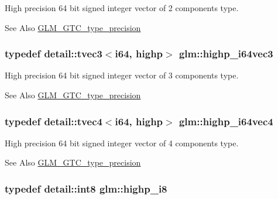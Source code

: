 High precision 64 bit signed integer vector of 2 components type. \begin{DoxySeeAlso}{See Also}
\hyperlink{group__gtc__type__precision}{G\-L\-M\-\_\-\-G\-T\-C\-\_\-type\-\_\-precision} 
\end{DoxySeeAlso}
\hypertarget{group__gtc__type__precision_ga4030f8ad15da56f5e427aa457d39e888}{
\subsubsection[{highp\-\_\-i64vec3}]{\setlength{\rightskip}{0pt plus 5cm}typedef detail\-::tvec3$<$i64, highp$>$ {\bf glm\-::highp\-\_\-i64vec3}}}\label{group__gtc__type__precision_ga4030f8ad15da56f5e427aa457d39e888}
High precision 64 bit signed integer vector of 3 components type. \begin{DoxySeeAlso}{See Also}
\hyperlink{group__gtc__type__precision}{G\-L\-M\-\_\-\-G\-T\-C\-\_\-type\-\_\-precision} 
\end{DoxySeeAlso}
\hypertarget{group__gtc__type__precision_ga0ea279cd954fbb71a1db62e897d4d7f5}{
\subsubsection[{highp\-\_\-i64vec4}]{\setlength{\rightskip}{0pt plus 5cm}typedef detail\-::tvec4$<$i64, highp$>$ {\bf glm\-::highp\-\_\-i64vec4}}}\label{group__gtc__type__precision_ga0ea279cd954fbb71a1db62e897d4d7f5}
High precision 64 bit signed integer vector of 4 components type. \begin{DoxySeeAlso}{See Also}
\hyperlink{group__gtc__type__precision}{G\-L\-M\-\_\-\-G\-T\-C\-\_\-type\-\_\-precision} 
\end{DoxySeeAlso}
\hypertarget{group__gtc__type__precision_ga8b9eb0b24cce7f14478bfcacb53ce839}{
\subsubsection[{highp\-\_\-i8}]{\setlength{\rightskip}{0pt plus 5cm}typedef detail\-::int8 {\bf glm\-::highp\-\_\-i8}}}\label{group__gtc__type__precision_ga8b9eb0b24cce7f14478bfcacb53ce839}

